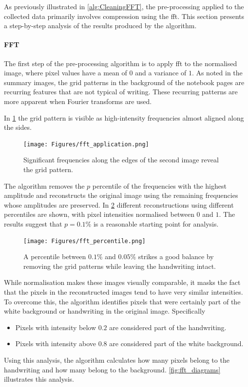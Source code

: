 \begin{toReview}
	\noindent As previously illustrated in \cref{alg:CleaningFFT}, the pre-processing applied to the collected data primarily involves compression using the \gls{fft}. This section presents a step-by-step analysis of the results produced by the algorithm.
    \paragraph{FFT}
    The first step of the pre-processing algorithm is to apply \gls{fft} to the normalised image, where pixel values have a mean of $0$ and a variance of $1$. As noted in the summary images, the grid patterns in the background of the notebook pages are recurring features that are not typical of writing. These recurring patterns are more apparent when Fourier transforms are used.

    \noindent In \cref{fig:fft_application} the grid pattern is visible as high-intensity frequencies almost aligned along the sides.
\newpage
    \begin{figure}[H]
    	\centering \texttt{[image: Figures/fft\_application.png]}\caption[FFT application in pre-processing]{Significant frequencies along the edges of the second image reveal the grid pattern.}\label{fig:fft_application}
    \end{figure}

	\noindent The algorithm removes the $p$ percentile of the frequencies with the highest amplitude and reconstructs the original image using the remaining frequencies whose amplitudes are preserved. In \cref{fig:fft_percentile} different reconstructions using different percentiles are shown, with pixel intensities normalised between $0$ and $1$. The results suggest that $p=0.1\%$ is a reasonable starting point for analysis.

	\begin{figure}[H]
		\centering \texttt{[image: Figures/fft\_percentile.png]}\caption[Comparing different percentiles in FFT]{A percentile between $0.1\%$ and $0.05\%$ strikes a good balance by removing the grid patterns while leaving the handwriting intact.}
		\label{fig:fft_percentile}
	\end{figure}

	\noindent While normalisation makes these images visually comparable, it masks the fact that the pixels in the reconstructed images tend to have very similar intensities. To overcome this, the algorithm identifies pixels that were certainly part of the white background or handwriting in the original image. Specifically
	\begin{itemize}
		\item Pixels with intensity below $0.2$ are considered part of the handwriting.
		\item Pixels with intensity above $0.8$ are considered part of the white background.
	\end{itemize}
	\noindent Using this analysis, the algorithm calculates how many pixels belong to the handwriting and how many belong to the background. \cref{fig:fft_diagrams} illustrates this analysis.


\end{toReview}
